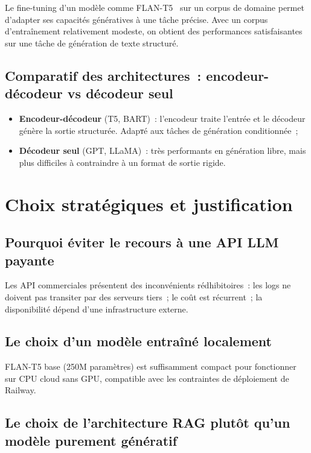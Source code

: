 \documentclass[12pt,a4paper]{report}
\begin{document}
Le fine-tuning d'un mod\`ele comme FLAN-T5~\cite{flanT5} sur un corpus de domaine
permet d'adapter ses capacit\'es g\'en\'eratives \`a une t\^ache pr\'ecise. Avec
un corpus d'entra\^inement relativement modeste, on obtient des performances
satisfaisantes sur une t\^ache de g\'en\'eration de texte structur\'e.

\subsection{Comparatif des architectures~: encodeur-d\'ecodeur vs d\'ecodeur seul}

\begin{itemize}[leftmargin=*]
  \item \textbf{Encodeur-d\'ecodeur} (T5, BART)~: l'encodeur traite l'entr\'ee
        et le d\'ecodeur g\'en\`ere la sortie structur\'ee. Adapт\'e aux t\^aches
        de g\'en\'eration conditionnée~;
  \item \textbf{D\'ecodeur seul} (GPT, LLaMA)~: tr\`es performants en g\'en\'eration
        libre, mais plus difficiles \`a contraindre \`a un format de sortie rigide.
\end{itemize}

\section{Choix strat\'egiques et justification}

\subsection{Pourquoi \'eviter le recours \`a une API LLM payante}

Les API commerciales pr\'esentent des inconv\'enients r\'edhibitoires~: les logs
ne doivent pas transiter par des serveurs tiers~; le co\^ut est r\'ecurrent~; la
disponibilit\'e d\'epend d'une infrastructure externe.

\subsection{Le choix d'un mod\`ele entra\^in\'e localement}

FLAN-T5 base (250M param\`etres) est suffisamment compact pour fonctionner sur CPU
cloud sans GPU, compatible avec les contraintes de d\'eploiement de Railway.

\subsection{Le choix de l'architecture RAG plut\^ot qu'un mod\`ele purement g\'en\'eratif}
\end{document}

